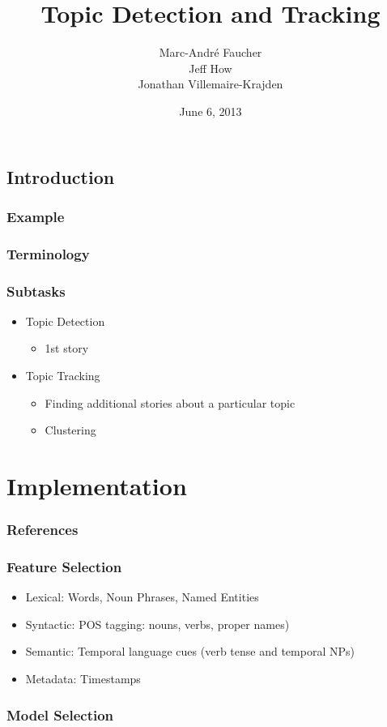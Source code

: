 \documentclass{beamer}
\title{Topic Detection and Tracking}
\author{
	Marc-André Faucher\\
	Jeff How\\
Jonathan Villemaire-Krajden}
\date{June 6, 2013}
\begin{document}
\begin{frame}[plain]
	\section{Introduction}
	\frametitle{Example}
	\titlepage
\end{frame}

\begin{frame}[plain]
	\frametitle{Terminology}
\end{frame}

\begin{frame}
	\frametitle{Subtasks}
	\begin{itemize}
		\item Topic Detection
			\begin{itemize}
				\item 1st story
			\end{itemize}
		\item Topic Tracking
			\begin{itemize}
				\item Finding additional stories about a particular topic
				\item Clustering
			\end{itemize}
	\end{itemize}
\end{frame}

\section{Implementation}
\begin{frame}
	\frametitle{References}
\end{frame}

\begin{frame}
	\frametitle{Feature Selection}
	\begin{itemize}
		\item Lexical: Words, Noun Phrases, Named Entities
		\item Syntactic: POS tagging: nouns, verbs, proper names)
		\item Semantic: Temporal language cues (verb tense and temporal NPs)\cite{Makkonen:2003:UTITDT}
		\item Metadata: Timestamps
	\end{itemize}
\end{frame}

\begin{frame}
	\frametitle{Model Selection}
\end{frame}
\end{document}
